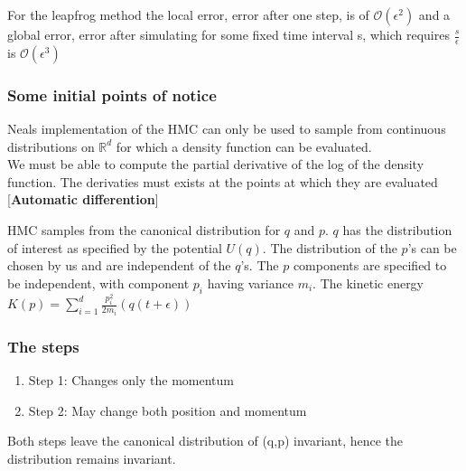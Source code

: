 \documentclass[]{report}
\begin{document}
For the leapfrog method the local error, error after one step, is of $\mathcal{O}(\epsilon^{2})$ and a global error, error after simulating for some fixed time interval s, which requires $\frac{s}{\epsilon}$ is $\mathcal{O}(\epsilon^{3})$
\subsubsection{Some initial points of notice}
Neals implementation of the HMC can only be used to sample from continuous distributions on $\mathbb{R}^{d}$ for which a density function can be evaluated.\\
We must be able to compute the partial derivative of the log of the density function. The derivaties must exists at the points at which they are evaluated [\textbf{Automatic differention}]

HMC samples from the canonical distribution for $q$ and $p$. $q$ has the distribution of interest as specified by the potential $U(q)$. 
The distribution of the $p$'s can be chosen by us and are independent of the $q$'s. 
The $p$ components are specified to be independent, with component $p_{i}$ having variance $m_{i}$.
The kinetic energy $K(p) = \sum_{i =1}^{d}\frac{p_{i}^{2}}{2m_{i}}(q(t + \epsilon))
$

\subsubsection{The steps}

\begin{enumerate}
	\item Step 1: Changes only the momentum
	\item Step 2: May change both position and momentum
\end{enumerate}
Both steps leave the canonical distribution of (q,p) invariant, hence the distribution remains invariant.
\end{document}
